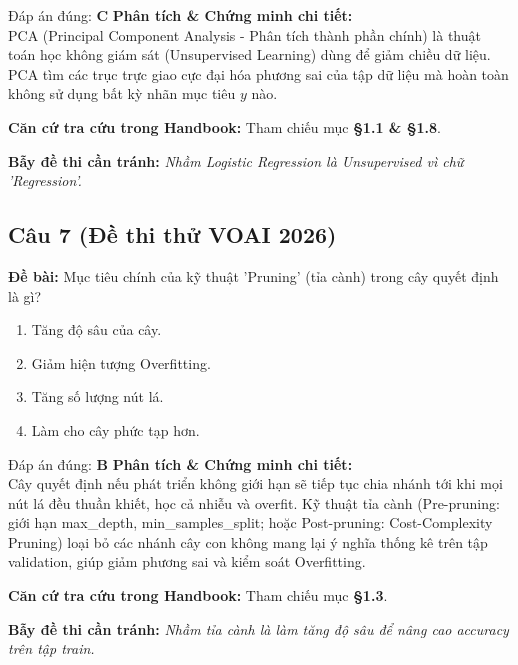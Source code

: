\documentclass[10pt,a4paper]{article}
\begin{document}
\begin{solbox}{Đáp án đúng: \textbf{C}}
\textbf{Phân tích \& Chứng minh chi tiết:} \\
PCA (Principal Component Analysis - Phân tích thành phần chính) là thuật toán học không giám sát (Unsupervised Learning) dùng để giảm chiều dữ liệu. PCA tìm các trục trực giao cực đại hóa phương sai của tập dữ liệu mà hoàn toàn không sử dụng bất kỳ nhãn mục tiêu $y$ nào.

\vspace{0.4em}
\textbf{Căn cứ tra cứu trong Handbook:} Tham chiếu mục \textbf{§1.1 \& §1.8}.

\vspace{0.4em}
\textbf{Bẫy đề thi cần tránh:} \textit{Nhầm Logistic Regression là Unsupervised vì chữ 'Regression'.}
\end{solbox}
\vspace{0.5em}


\subsection*{Câu 7 (Đề thi thử VOAI 2026)}
\textbf{Đề bài:} Mục tiêu chính của kỹ thuật 'Pruning' (tỉa cành) trong cây quyết định là gì?

\begin{enumerate}[label=\textbf{\Alph*.}]
    \item Tăng độ sâu của cây.
    \item Giảm hiện tượng Overfitting.
    \item Tăng số lượng nút lá.
    \item Làm cho cây phức tạp hơn.
\end{enumerate}

\begin{solbox}{Đáp án đúng: \textbf{B}}
\textbf{Phân tích \& Chứng minh chi tiết:} \\
Cây quyết định nếu phát triển không giới hạn sẽ tiếp tục chia nhánh tới khi mọi nút lá đều thuần khiết, học cả nhiễu và overfit. Kỹ thuật tỉa cành (Pre-pruning: giới hạn max\_depth, min\_samples\_split; hoặc Post-pruning: Cost-Complexity Pruning) loại bỏ các nhánh cây con không mang lại ý nghĩa thống kê trên tập validation, giúp giảm phương sai và kiểm soát Overfitting.

\vspace{0.4em}
\textbf{Căn cứ tra cứu trong Handbook:} Tham chiếu mục \textbf{§1.3}.

\vspace{0.4em}
\textbf{Bẫy đề thi cần tránh:} \textit{Nhầm tỉa cành là làm tăng độ sâu để nâng cao accuracy trên tập train.}
\end{solbox}
\vspace{0.5em}
\end{document}
